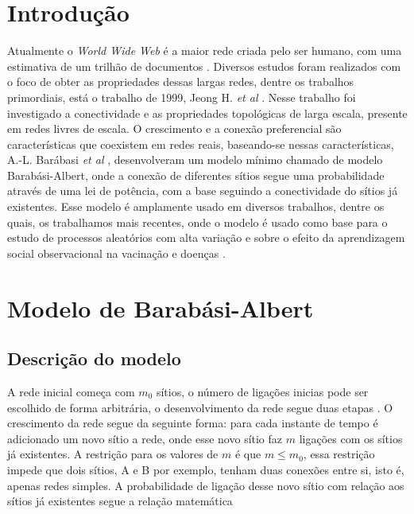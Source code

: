 \documentclass[10pt,a4paper]{article}
\begin{document}
\section{Introdução}
Atualmente o {\it World Wide Web} é a maior rede criada pelo ser humano, com uma estimativa de um trilhão de documentos \cite{barabasi2013network}. Diversos estudos foram realizados com o foco de obter as propriedades dessas largas redes, dentre os trabalhos primordiais, está o trabalho de 1999, Jeong H. {\it et al} \cite{https://doi.org/10.48550/arxiv.cond-mat/9907038}. Nesse trabalho foi investigado a conectividade e as propriedades topológicas de larga escala, presente em redes livres de escala. O crescimento e a conexão preferencial são características que coexistem em redes reais, baseando-se nessas características, A.-L. Barábasi {\it et al} \cite{https://doi.org/10.48550/arxiv.cond-mat/9910332}, desenvolveram um modelo mínimo chamado de modelo Barabási-Albert, onde a conexão de diferentes sítios segue uma probabilidade através de uma lei de potência, com a base seguindo a conectividade do sítios já existentes. Esse modelo é amplamente usado em diversos trabalhos, dentre os quais, os trabalhamos mais recentes, onde o modelo é usado como base para o estudo de processos aleatórios com alta variação \cite{https://doi.org/10.48550/arxiv.2202.00845} e sobre o efeito da aprendizagem social observacional na vacinação e doenças \cite{https://doi.org/10.48550/arxiv.2204.11452}.


\section{Modelo de Barabási-Albert}

\subsection{Descrição do modelo}
A rede inicial começa com $m_0$ sítios, o número de ligações inicias pode ser escolhido de forma arbitrária, o desenvolvimento da rede segue duas etapas \cite{barabasi2013network}. 
O crescimento da rede segue da seguinte forma: para cada instante de tempo é adicionado um novo sítio a rede, onde esse novo sítio faz $m$ ligações com os sítios já existentes. A restrição para os valores de $m$ é que $m \le m_0$, essa restrição impede que dois sítios, A e B por exemplo, tenham duas conexões entre si, isto é, apenas redes simples. A probabilidade de ligação desse novo sítio com relação aos sítios já existentes segue a relação matemática
\end{document}
